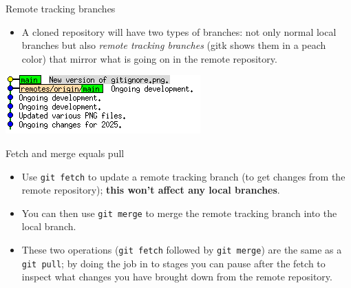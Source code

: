 \documentclass[usenames,dvipsnames]{beamer}
\newcommand{\code}[1]{\colorbox{light-gray}{\texttt{#1}}}
\begin{document}
\begin{frame}{Remote tracking branches}
  \begin{block}{}
    \begin{itemize}
      \item{A cloned repository will have two types of branches: not only normal local branches but also \textit{remote tracking branches} (gitk shows them in a peach color) that mirror what is going on in the remote repository.}
    \end{itemize}
    \begin{center}
      \includegraphics[scale=0.8]{RemoteTrackingBranch.png}
    \end{center}
  \end{block}
\end{frame}

\begin{frame}{Fetch and merge equals pull}
  \begin{block}{}
    \begin{itemize}
      \item{Use \code{git fetch} to update a remote tracking branch (to get changes from the remote repository); \textbf{this won't affect any local branches}.}
      \item{You can then use \code{git merge} to merge the remote tracking branch into the local branch.}
      \item{These two operations (\code{git fetch} followed by \code{git merge}) are the same as a \code{git pull}; by doing the job in to stages you can pause after the fetch to inspect what changes you have brought down from the remote repository.}
    \end{itemize}
  \end{block}
\end{frame}
\end{document}
